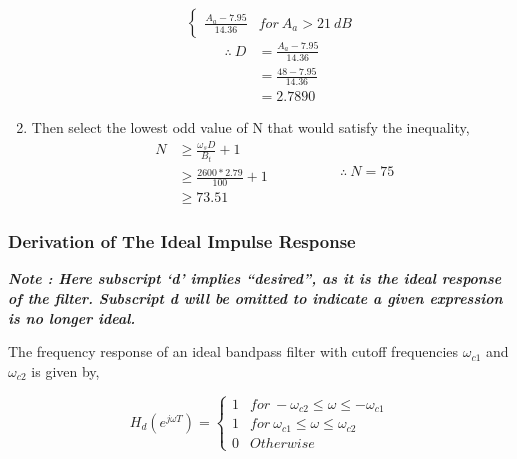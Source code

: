 \documentclass[a4paper,11pt]{article}%
\begin{document}
\begin{enumerate}[\hspace{1cm}a.)]
\[\begin{cases}
	\frac{A_a - 7.95}{14.36} & for ~ A_a > 21 ~dB
\end{cases}
\]\hspace{2cm}
\[
\begin{split}
	\therefore~ D &= \frac{A_a - 7.95}{14.36}\\
	&=\frac{48 - 7.95}{14.36}\\
	&=  2.7890
\end{split}
\]

\item Then select the lowest odd value of N that would satisfy the inequality,
\[
\begin{split}
	N  & \geq \frac{\omega_sD}{B_t}+1\\
	&\geq \frac{2600*2.79}{100}+1\\
	&\geq 73.51
\end{split}
\hspace{2cm}
\therefore~	N = 75
\]
\end{enumerate}
\subsubsection{Derivation of The Ideal Impulse Response}

\textbf{\textit{Note : Here subscript `d' implies ``desired'', as it is the ideal response of the filter. Subscript d will be omitted to indicate a given expression is no longer ideal.\\}}

The frequency response of an ideal bandpass filter with cutoff frequencies $\omega_{c1}$ and $\omega_{c2}$ is given by,

\[
H_d(e^{j\omega T}) = \begin{cases}
1& for~ -\omega_{c2} \le \omega \le -\omega_{c1}\\
1& for ~\omega_{c1} \le \omega \le \omega_{c2}\\
0& Otherwise
\end{cases}
\]
\end{document}
